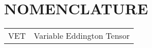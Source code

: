 
\chapter*{NOMENCLATURE}


\hspace*{-1.25in}
\vspace{12pt}
\begin{spacing}{1.0}
	\begin{longtable}[htbp]{@{}p{} p{}@{}}
		VET 		& Variable Eddington Tensor\\	[2ex]
	\end{longtable}
\end{spacing}

\pagebreak{}